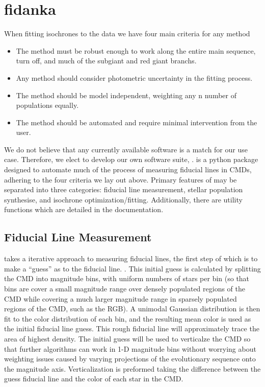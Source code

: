 \section{fidanka}\label{sec:fidanka}
When fitting isochrones to the data we have four main criteria for any method

\begin{itemize}
	\item The method must be robust enough to work along the entire main sequence, turn off, and much of the subgiant and red giant branchs.
	\item Any method should consider photometric uncertainty in the fitting process.
	\item The method should be model independent, weighting any n number of populations equally.
	\item The method should be automated and require minimal intervention from the user.
\end{itemize}


We do not believe that any currently available software is a match for
our use case. Therefore, we elect to develop our own software suite, \fidanka.
\fidanka is a python package designed to automate much of the process of
measuring fiducial lines in CMDs, adhering to the four criteria we lay out
above. Primary features of \fidanka may be separated into three
categories: fiducial line measurement, stellar population synthesise, and
isochrone optimization/fitting. Additionally, there are utility functions which
are detailed in the \fidanka documentation.

\subsection{Fiducial Line Measurement}
\fidanka takes a iterative approach to measuring fiducial lines, the first step
of which is to make a ``guess'' as to the fiducial line. . This initial guess
is calculated by splitting the CMD into magnitude bins, with uniform numbers of
stars per bin (so that bins are cover a small magnitude range over densely
populated regions of the CMD while covering a much larger magnitude range in
sparsely populated regions of the CMD, such as the RGB). A unimodal Gaussian
distribution is then fit to the color distribution of each bin, and the
resulting mean color is used as the initial fiducial line guess. This rough
fiducial line will approximately trace the area of highest density. The initial
guess will be used to verticalze the CMD so that further algorithms can work in
1-D magnitude bins without worrying about weighting issues caused by varying
projections of the evolutionary sequence onto the magnitude axis.
Verticalization is preformed taking the difference between the guess fiducial
line and the color of each star in the CMD.

